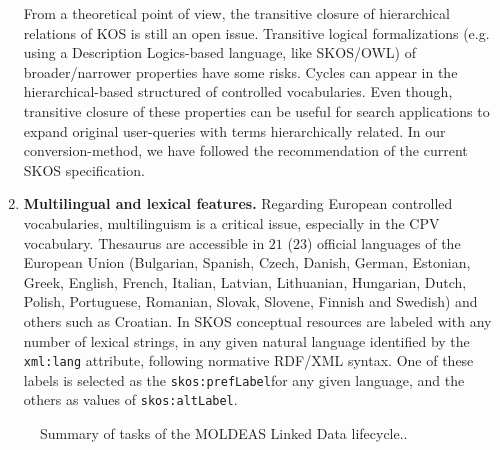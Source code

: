 \begin{enumerate}
 From a theoretical point of view, the transitive closure of hierarchical relations 
 of KOS is still an open issue. Transitive logical formalizations (e.g. using a Description Logics-based language, like SKOS/OWL) 
 of broader/narrower properties have some risks. Cycles can appear in the hierarchical-based structured 
 of controlled vocabularies. Even though, transitive closure of these properties can be useful for 
 search applications to expand original user-queries with terms hierarchically related. In our conversion-method, 
 we have followed the recommendation of the current SKOS specification.
 
 \item \textbf{Multilingual and lexical features.} Regarding European controlled vocabularies, 
 multilinguism is a critical issue, especially in the CPV vocabulary. 
 Thesaurus are accessible in $21$ ($23$) official languages of the European Union 
 (Bulgarian, Spanish, Czech, Danish, German, Estonian, Greek, English, French, Italian, Latvian, Lithuanian, 
 Hungarian, Dutch, Polish, Portuguese, Romanian, Slovak, Slovene, Finnish and Swedish) and others such as Croatian. 
 In SKOS conceptual resources are labeled with any number of lexical strings, in any given natural 
 language identified by the \texttt{xml:lang} attribute, following normative RDF/XML syntax. 
 One of these labels is selected as the \texttt{skos:prefLabel}for any given language, and the 
 others as values of \texttt{skos:altLabel}.
 
\end{enumerate}


\begin{figure}[ht]
\centering
 \caption{Summary of tasks of the MOLDEAS Linked Data lifecycle..}
 \label{fig:summary-tasks}
\end{figure}


% 

